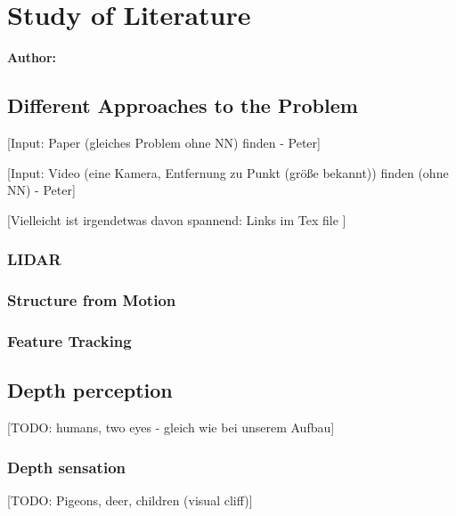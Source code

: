 \chapter{Study of Literature}

\textbf{Author: } 

\section{Different Approaches to the Problem}
[Input: Paper (gleiches Problem ohne NN) finden - Peter]

[Input: Video (eine Kamera, Entfernung zu Punkt (größe bekannt)) finden (ohne NN) - Peter]


[Vielleicht ist irgendetwas davon spannend:
Links im Tex file
]

\subsection{LIDAR}

\subsection{Structure from Motion}

\subsection{Feature Tracking}

\section{Depth perception}
[TODO: humans, two eyes - gleich wie bei unserem Aufbau]

\subsection{Depth sensation}
[TODO: Pigeons, deer, children (visual cliff)]

\filbreak